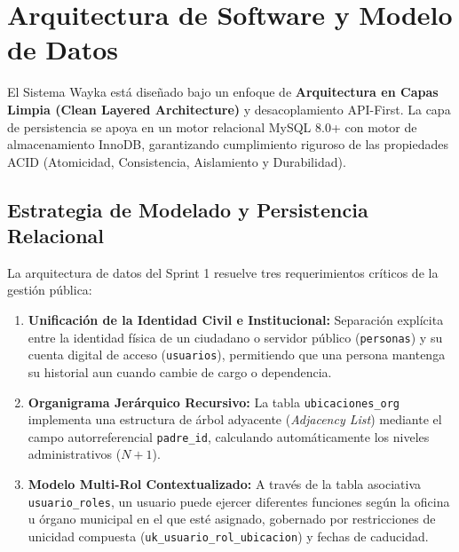 \documentclass[a4paper,12pt]{article}
\begin{document}
\section{Arquitectura de Software y Modelo de Datos}

El Sistema Wayka está diseñado bajo un enfoque de \textbf{Arquitectura en Capas Limpia (Clean Layered Architecture)} y desacoplamiento API-First. La capa de persistencia se apoya en un motor relacional MySQL 8.0+ con motor de almacenamiento InnoDB, garantizando cumplimiento riguroso de las propiedades ACID (Atomicidad, Consistencia, Aislamiento y Durabilidad).

\subsection{Estrategia de Modelado y Persistencia Relacional}
La arquitectura de datos del Sprint 1 resuelve tres requerimientos críticos de la gestión pública:
\begin{enumerate}[leftmargin=1.5em]
    \item \textbf{Unificación de la Identidad Civil e Institucional:} Separación explícita entre la identidad física de un ciudadano o servidor público (\texttt{personas}) y su cuenta digital de acceso (\texttt{usuarios}), permitiendo que una persona mantenga su historial aun cuando cambie de cargo o dependencia.
    \item \textbf{Organigrama Jerárquico Recursivo:} La tabla \texttt{ubicaciones\_org} implementa una estructura de árbol adyacente (\emph{Adjacency List}) mediante el campo autorreferencial \texttt{padre\_id}, calculando automáticamente los niveles administrativos ($N+1$).
    \item \textbf{Modelo Multi-Rol Contextualizado:} A través de la tabla asociativa \texttt{usuario\_roles}, un usuario puede ejercer diferentes funciones según la oficina u órgano municipal en el que esté asignado, gobernado por restricciones de unicidad compuesta (\texttt{uk\_\allowbreak usuario\_\allowbreak rol\_\allowbreak ubicacion}) y fechas de caducidad.
\end{enumerate}
\end{document}

